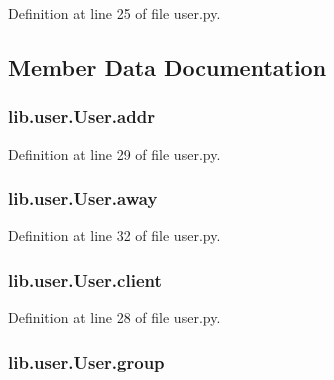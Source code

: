 Definition at line 25 of file user.\+py.



\subsection{Member Data Documentation}
\subsubsection[{\texorpdfstring{addr}{addr}}]{\setlength{\rightskip}{0pt plus 5cm}lib.\+user.\+User.\+addr}\hypertarget{classlib_1_1user_1_1_user_aae774ceeb015a24d3146d846fac2fa29}{}\label{classlib_1_1user_1_1_user_aae774ceeb015a24d3146d846fac2fa29}


Definition at line 29 of file user.\+py.

\subsubsection[{\texorpdfstring{away}{away}}]{\setlength{\rightskip}{0pt plus 5cm}lib.\+user.\+User.\+away}\hypertarget{classlib_1_1user_1_1_user_a04b4c9794378737a3192ceb1cfdfaa88}{}\label{classlib_1_1user_1_1_user_a04b4c9794378737a3192ceb1cfdfaa88}


Definition at line 32 of file user.\+py.

\subsubsection[{\texorpdfstring{client}{client}}]{\setlength{\rightskip}{0pt plus 5cm}lib.\+user.\+User.\+client}\hypertarget{classlib_1_1user_1_1_user_a2a6f2d3517eedf2685aaae828e24a220}{}\label{classlib_1_1user_1_1_user_a2a6f2d3517eedf2685aaae828e24a220}


Definition at line 28 of file user.\+py.

\subsubsection[{\texorpdfstring{group}{group}}]{\setlength{\rightskip}{0pt plus 5cm}lib.\+user.\+User.\+group}\hypertarget{classlib_1_1user_1_1_user_aaa56c9aaaa7cf86cd79c7229787bfd3f}{}\label{classlib_1_1user_1_1_user_aaa56c9aaaa7cf86cd79c7229787bfd3f}



